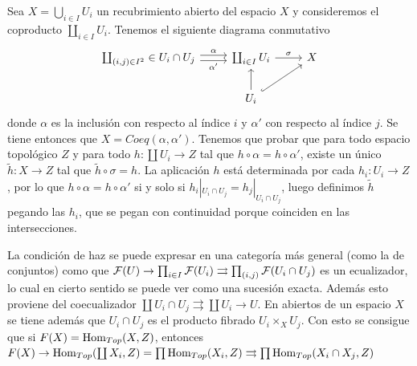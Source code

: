 \documentclass[GA.tex]{subfiles}
\begin{document}
Sea $X=\bigcup_{i\in I}U_i$ un recubrimiento abierto del espacio $X$ y consideremos el coproducto $\coprod_{i\in I}U_i$. Tenemos el siguiente diagrama conmutativo 
\[
\begin{tikzcd}
\coprod_{(i,j)\in I^2}\in U_i\cap U_j\arrow[r, shift left, "\alpha"]\arrow[r, shift right,"\alpha'"']&\coprod_{i\in I}U_i\arrow[r, "\sigma"] & X\\
&U_i\arrow[u]\arrow[ur,hookrightarrow]&
\end{tikzcd}
\]
donde $\alpha$ es la inclusión con respecto al índice $i$ y $\alpha'$ con respecto al índice $j$. Se tiene entonces que $X=Coeq(\alpha,\alpha')$. Tenemos que probar que para todo espacio topológico $Z$ y para todo $h:\coprod U_i\to Z$ tal que $h\circ\alpha=h\circ\alpha'$, existe un único $\tilde{h}: X\to Z$ tal que $\tilde{h}\circ\sigma=h$. La aplicación $h$ está determinada por cada $h_i:U_i\to Z$, por lo que $h\circ \alpha=h\circ\alpha'$ si y solo si $h_i|_{U_i\cap U_j}=h_j|_{U_i\cap U_j}$, luego definimos $\tilde{h}$ pegando las $h_i$, que se pegan con continuidad porque coinciden en las intersecciones.

\begin{nota}
La condición de haz se puede expresar en una categoría más general (como la de conjuntos) como que $\mathcal{F}(U)\to\prod_{i\in I}\mathcal{F}(U_i)\rightrightarrows \prod_{(i,j)}\mathcal{F}(U_i\cap U_j)$ es un ecualizador, lo cual en cierto sentido se puede ver como una sucesión exacta. Además esto proviene del coecualizador $\coprod U_i\cap U_j\rightrightarrows \coprod U_i\to U$. En abiertos de un espacio $X$ se tiene además que $U_i\cap U_j$ es el producto fibrado $U_i\times_X U_j$. Con esto se consigue que si $F(X)=\operatorname{Hom}_{Top}(X,Z)$, entonces $F(X)\to \operatorname{Hom}_{Top}(\coprod X_i, Z)=\prod\operatorname{Hom}_{Top}(X_i,Z)\rightrightarrows \prod\operatorname{Hom}_{Top}(X_i\cap X_j,Z)$
\end{nota}
\end{document}
